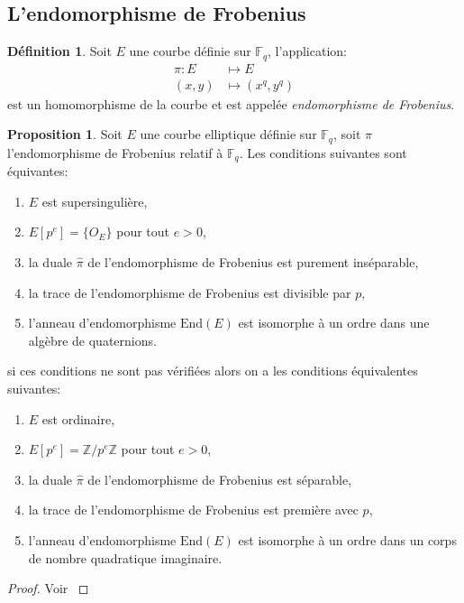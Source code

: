 \documentclass[10pt,a4paper]{book}
\theoremstyle{plain}
\theoremstyle{definition}
\theoremstyle{definition}
\theoremstyle{definition}
\newtheorem{prop}[thm]{Proposition}
\theoremstyle{definition}
\newtheorem{defi}[thm]{Définition}
\theoremstyle{remark}
\theoremstyle{remark}
\begin{document}
\subsection{L'endomorphisme de Frobenius}
\begin{defi}
Soit $E$ une courbe définie sur $\mathbb{F}_q$, l'application: 
\begin{equation*}
\begin{alignedat}{1}
\pi :E &\mapsto  E  \\
 (x,y)  &\mapsto (x^q,y^q)  
\end{alignedat}
\end{equation*}
est un homomorphisme de la courbe et est appelée \emph{endomorphisme de Frobenius}. 
\end{defi}

\begin{prop}
Soit $E$ une courbe elliptique définie sur $\mathbb{F}_q$, soit $\pi$ l'endomorphisme de Frobenius relatif à $\mathbb{F}_q$. Les conditions suivantes sont équivantes:
\begin{enumerate}
\item $E$ est supersingulière,
\item $E[p^e]=\{O_E\}$ pour tout $e > 0$,
\item la duale $\widehat{\pi}$ de l'endomorphisme de Frobenius est purement inséparable,
\item la trace de l'endomorphisme de Frobenius est divisible par $p$,
\item l'anneau d'endomorphisme $\mathrm{End}(E)$ est isomorphe à un ordre dans une algèbre de quaternions.
\end{enumerate}
si ces conditions ne sont pas vérifiées alors on a les conditions équivalentes suivantes:
\begin{enumerate}
\item $E$ est ordinaire,
\item $E[p^e]=\mathbb{Z}/p^e\mathbb{Z}$ pour tout $e > 0$,
\item la duale $\widehat{\pi}$ de l'endomorphisme de Frobenius est séparable,
\item la trace de l'endomorphisme de Frobenius est première avec $p$,
\item l'anneau d'endomorphisme $\mathrm{End}(E)$ est isomorphe à un ordre dans un corps de nombre quadratique imaginaire.
\end{enumerate}
\end{prop}

\begin{proof}
Voir \cite[Theorem V.3.1]{Silv1}
\end{proof}
\end{document}
